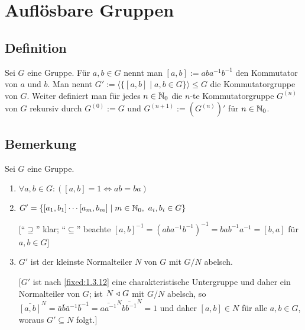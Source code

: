 
\section{Auflösbare Gruppen}

\subsection{Definition} Sei $G$ eine Gruppe. Für $a,b \in G$ nennt man $[a,b]:=aba^{-1}b^{-1}$ den Kommutator von $a$ und $b$. Man nennt $G':=\langle\{[a,b]\mid a,b\in G\}\rangle\leq G$ die Kommutatorgruppe von $G$. Weiter definiert man für
jedes $n\in\mathbb N_0$ die $n$-te Kommutatorgruppe $G^{(n)}$ von $G$ rekursiv durch $G^{(0)}:=G$ und $G^{(n+1)}:=(G^{(n)})'$ für $n\in\mathbb N_0$.

\subsection{Bemerkung} Sei $G$ eine Gruppe.
\begin{enumerate}[label=(\alph*)]
	\item
		$\forall a,b\in G:([a,b]=1\iff ab=ba)$
		
	\item
		$G'=\{[a_1,b_1]\cdots[a_m,b_m]\mid m\in\mathbb N_0,~a_i,b_i\in G\}$

		["`$\supseteq$"' klar; "`$\subseteq$"' beachte $[a,b]^{-1}=(aba^{-1}b^{-1})^{-1}=bab^{-1}a^{-1}=[b,a]$ für $a,b\in G$]
		
	\item
		$G'$ ist der kleinste Normalteiler $N$ von $G$ mit $G/N$ abelsch.

		[$G'$ ist nach \ref{fixed:1.3.12} eine charakteristische Untergruppe und daher ein Normalteiler von $G$; ist $N \mathrel\triangleleft G$ mit $G/N$ abelsch, so $\bar{[a,b]}^N=\bar a \bar b \bar a^{-1} \bar b^{-1}=\bar{aa^{-1}}^N \bar{bb^{-1}}^N=1$ und daher $[a,b]\in N$ für alle $a,b\in G$, woraus $G'\subseteq N$ folgt.]
\end{enumerate}


